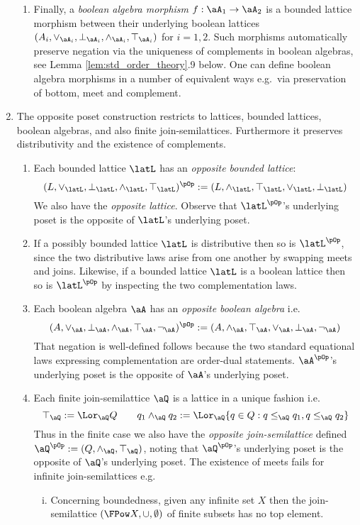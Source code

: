 \documentclass{article}
\begin{document}
\begin{definition}
\begin{enumerate}
\begin{enumerate}
\item
Finally, a \emph{boolean algebra morphism} $f : \aA_1 \to \aA_2$ is a bounded lattice morphism between their underlying boolean lattices $(A_i,\lor_{\aA_i},\bot_{\aA_i},\land_{\aA_i},\top_{\aA_i})$ for $i = 1,2$. Such morphisms automatically preserve negation via the uniqueness of complements in boolean algebras, see Lemma \ref{lem:std_order_theory}.9 below. One can define boolean algebra morphisms in a number of equivalent ways e.g.\ via preservation of bottom, meet and complement.

\end{enumerate}


\item
The opposite poset construction restricts to lattices, bounded lattices, boolean algebras, and also finite join-semilattices. Furthermore it preserves distributivity and the existence of complements.

\begin{enumerate}
\item
Each bounded lattice $\latL$ has an \emph{opposite bounded lattice}:
\[
(L,\lor_\latL,\bot_\latL,\land_\latL,\top_\latL)^{\pOp} := (L,\land_\latL,\top_\latL,\lor_\latL,\bot_\latL)
\]
We also have the \emph{opposite lattice}. Observe that $\latL^{\pOp}$'s underlying poset is the opposite of $\latL$'s underlying poset.

\item
If a possibly bounded lattice $\latL$ is distributive then so is $\latL^{\pOp}$, since the two distributive laws arise from one another by swapping meets and joins. Likewise, if a bounded lattice $\latL$ is a boolean lattice then so is $\latL^{\pOp}$ by inspecting the two complementation laws.

\item
Each boolean algebra $\aA$ has an \emph{opposite boolean algebra} i.e.\ 
\[
(A,\lor_\aA,\bot_\aA,\land_\aA,\top_\aA,\neg_\aA)^{\pOp} 
:= (A,\land_\aA,\top_\aA,\lor_\aA,\bot_\aA,\neg_\aA)
\]
That negation is well-defined follows because the two standard equational laws expressing complementation are order-dual statements. $\aA^{\pOp}$'s underlying poset is the opposite of $\aA$'s underlying poset.


\item
Each finite join-semilattice $\aQ$ is a lattice in a unique fashion i.e.\
\[
\top_\aQ := \Lor_\aQ Q
\qquad
q_1 \land_\aQ q_2 := \Lor_\aQ \{ q \in Q : q \leq_\aQ q_1, q \leq_\aQ q_2 \}
\]
Thus in the finite case we also have the \emph{opposite join-semilattice} defined  $\aQ^{\pOp} := (Q,\land_\aQ,\top_\aQ)$, noting that $\aQ^{\pOp}$'s underlying poset is the opposite of $\aQ$'s underlying poset. The existence of meets fails for infinite join-semilattices e.g.\
\begin{enumerate}[(i)]
\item
Concerning boundedness, given any infinite set $X$ then the join-semilattice $(\FPow X,\cup,\emptyset)$ of finite subsets has no top element.


\end{enumerate}
\end{enumerate}
\end{enumerate}
\end{definition}
\end{document}
